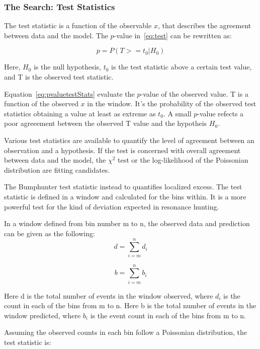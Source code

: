 \subsubsection{The Search: Test Statistics}
\label{teststatistics}
The test statistic is a function of the observable $x$, that describes the agreement between data and the model.  The $p$-value in~\ref{eq:test} can be rewritten as:
    
\begin{equation}
    p = P(T>=t_{0}| H_{0})
\label{eq:pvaluetestStats}
\end{equation}

Here, $H_0$ is the null hypothesis, $t_0$ is the test statistic above a certain test value, and T is the observed test statistic.

Equation~\ref{eq:pvaluetestStats} evaluate the $p$-value of the observed value. T is a function of the observed $x$ in the window. It's the probability of the observed test statistics obtaining a value at least as extreme as $t_{0}$. A small $p$-value refects a poor agreeement between the observed T value and the hypotheis $H_{0}$.

Various test statistics are available to quantify the level of agreement between an observation and a hypothesis. If the test is concerned with overall agreement between data and the model, the $\chi^{2}$ test or the log-likelihood of the Poissonian distribution are fitting candidates.

The Bumphunter test statistic instead to quantifies localized excess. The test statistic is defined in a window and calculated for the bins within. It is a more powerful test for the kind of deviation expected in resonance hunting.

In a window defined from bin number m to n, the observed data and prediction can be given as the following: 
    \begin{equation}
         d= \sum_{i=m}^{n} d_i 
    \end{equation}

    
    \begin{equation}
         b= \sum_{i=m}^{n} b_i
    \end{equation}

    Here d is the total number of events in the window observed, where $d_i$ is the count in each of the bins from m to n. 
    Here b is the total number of events in the window predicted, where $b_i$ is the event count in each of the bins from m to n.
    
    Assuming the observed counts in each bin follow a Poissonian distribution, the test statistic is:

